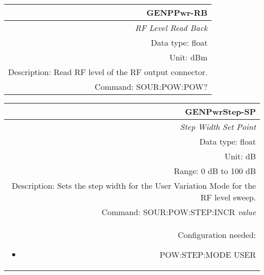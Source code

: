 \documentclass[openany]{article}
\begin{document}
		\begin{tabular}{N}
			\hline
			\bfseries GENPPwr-RB \\ \hline
			\emph{RF Level Read Back} \\
			Data type: float \\
			Unit: dBm \\
			Description: Read RF level of the RF output connector. \\
			Command: SOUR:POW:POW? \\

		\end{tabular}
%
		\begin{tabular}{N}
			\hline
			\bfseries GENPwrStep-SP \\ \hline
			\emph{Step Width Set Point} \\
			Data type: float \\
			Unit: dB \\
			Range: 0 dB to 100 dB \\
			Description: Sets the step width for the User Variation Mode for the RF level sweep. \\
			Command: SOUR:POW:STEP:INCR \emph{value} \\
			Configuration needed: \begin{itemize}[noitemsep]
				\small
				\item[] POW:STEP:MODE USER
			\end{itemize} \\

		\end{tabular}
\end{document}
